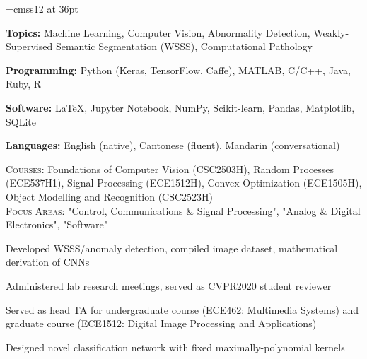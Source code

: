 \documentclass[12pt]{cv_style}
\begin{document}
\font\titlefont=cmss12 at 36pt


\begin{ditem}
	\item \textbf{Topics:} Machine Learning, Computer Vision, Abnormality Detection, Weakly-Supervised Semantic Segmentation (WSSS), Computational Pathology
	\item \textbf{Programming:} Python (Keras, TensorFlow, Caffe), MATLAB, C/C++, Java, Ruby, R
	\item \textbf{Software:} \LaTeX, Jupyter Notebook, NumPy, Scikit-learn, Pandas, Matplotlib, SQLite
	\item \textbf{Languages:} English (native), Cantonese (fluent), Mandarin (conversational)
\end{ditem}

\flushleft{}
\medspace
\textsc{Courses:} Foundations of Computer Vision (CSC2503H), Random Processes (ECE537H1), Signal Processing (ECE1512H), Convex Optimization (ECE1505H), Object Modelling and Recognition (CSC2523H)\\
\medspace
{}
\medspace
\textsc{Focus Areas:} "Control, Communications \& Signal Processing", "Analog \& Digital Electronics", "Software"
\medspace

\begin{ditem}
	\item Developed WSSS/anomaly detection, compiled image dataset, mathematical derivation of CNNs\\
	\item Administered lab research meetings, served as CVPR2020 student reviewer\\
	\item Served as head TA for undergraduate course (ECE462: Multimedia Systems) and graduate course (ECE1512: Digital Image Processing and Applications)\\
\end{ditem}
%
\medspace
Designed novel classification network with fixed maximally-polynomial kernels\\
\medspace
%
\end{document}
